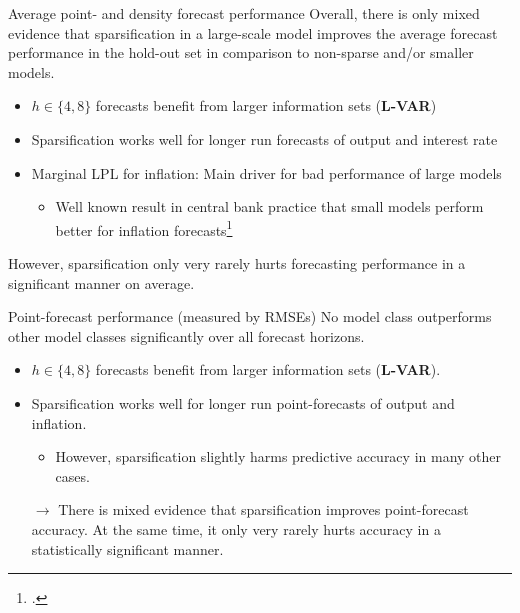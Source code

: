 \begin{frame}{Average point- and density forecast performance}
    Overall, there is only mixed evidence that sparsification in a large-scale model improves the average forecast performance in the hold-out set in comparison to non-sparse and/or smaller models.
    
    \begin{itemize}
        \item $h \in \{ 4 , 8 \}$ forecasts benefit from larger information sets (\textbf{L-VAR})
        \item Sparsification works well for longer run forecasts of output and interest rate
        \item Marginal LPL for inflation: Main driver for bad performance of large models
            \begin{itemize}
                \item Well known result in central bank practice that small models perform better for inflation forecasts\footcite{giannone_prior_2015}
            \end{itemize}
    \end{itemize}
    
    However, sparsification only very rarely hurts forecasting performance in a significant manner on average.
\end{frame}

\iffalse
    \begin{frame}{Point-forecast performance (measured by RMSEs)}
        No model class outperforms other model classes significantly over all forecast horizons.
        \begin{itemize}
            \item $h \in \{ 4 , 8 \}$ forecasts benefit from larger information sets (\textbf{L-VAR}).
            \item Sparsification works well for longer run point-forecasts of output and inflation.
                \begin{itemize}
                    \item However, sparsification slightly harms predictive accuracy in many other cases.
                \end{itemize}
        \end{itemize}
        
        \begin{itemize}
            \item[$\rightarrow$] There is mixed evidence that sparsification improves point-forecast accuracy. At the same time, it only very rarely hurts accuracy in a statistically significant manner.
        \end{itemize}
    \end{frame}
    
